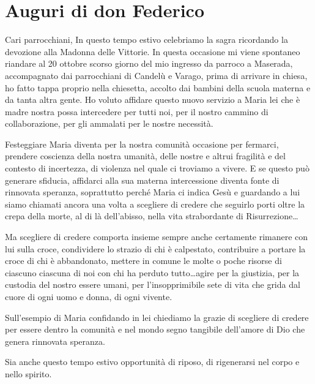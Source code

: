 \section{Auguri di don Federico}

Cari parrocchiani,
In questo tempo estivo celebriamo la sagra ricordando la devozione alla Madonna delle Vittorie. In questa occasione mi viene spontaneo riandare al 20 ottobre scorso giorno del mio ingresso da parroco a Maserada, accompagnato dai parrocchiani di Candelù e Varago, prima di arrivare in chiesa, ho fatto tappa proprio nella chiesetta, accolto dai bambini della scuola materna e da tanta altra gente. Ho voluto affidare questo nuovo servizio a Maria lei che è madre nostra possa intercedere per tutti noi, per il nostro cammino di collaborazione, per gli ammalati per le nostre necessità.

Festeggiare Maria diventa per la nostra comunità occasione per fermarci, prendere coscienza della nostra umanità, delle nostre e altrui fragilità e del contesto di incertezza, di violenza nel quale ci troviamo a vivere. E se questo può generare sfiducia, affidarci alla sua materna intercessione diventa fonte di rinnovata speranza, soprattutto perché Maria ci indica Gesù e guardando a lui siamo chiamati ancora una volta a scegliere di credere che seguirlo porti oltre la crepa della morte, al di là dell'abisso, nella vita strabordante di Risurrezione\ldots

Ma scegliere di credere comporta insieme sempre anche certamente rimanere con lui sulla croce, condividere lo strazio di chi è calpestato, contribuire a portare la croce di chi è abbandonato, mettere in comune le molte o poche risorse di ciascuno ciascuna di noi con chi ha perduto tutto\ldots agire per la giustizia, per la custodia del nostro essere umani, per l'insopprimibile sete di vita che grida dal cuore di ogni uomo e donna, di ogni vivente.

Sull'esempio di Maria confidando in lei chiediamo la grazie di scegliere di credere per essere dentro la comunità e nel mondo segno tangibile dell'amore di Dio che genera rinnovata speranza.

Sia anche questo tempo estivo opportunità di riposo, di rigenerarsi nel corpo e nello spirito.


